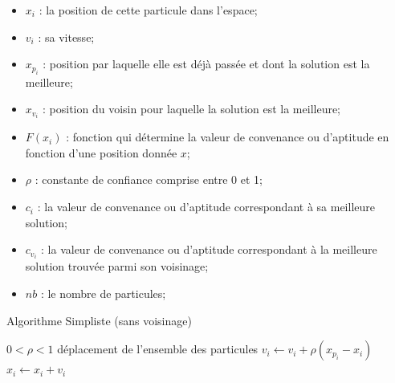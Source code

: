 \documentclass[12pt]{article}
\begin{document}
\begin{itemize}
	\item \textit{ $x_{i}$ } : la position de cette particule dans l'espace;
	\item \textit{ $v_{i}$ } : sa vitesse;
	\item  \textit{ $x_{p_{i}}$ } : position par laquelle elle est déjà passée et dont la solution est la meilleure; 
	\item  \textit{ $x_{v_{i}}$ } : position du voisin pour laquelle la solution est la meilleure; 
 	\item \textit{ $F(x_{i})$ } : fonction qui détermine la valeur de convenance ou d'aptitude en fonction d'une position donnée $x$;
    \item \textit{ $\rho$ } : constante de confiance comprise entre 0 et 1;
    \item \textit{ $c_{i}$ } : la valeur de convenance ou d'aptitude correspondant à sa meilleure solution;
    \item \textit{ $c_{v_{i}}$ } : la valeur de convenance ou d'aptitude correspondant à la meilleure solution trouvée parmi son voisinage;
    \item \textit{ $nb$ } : le nombre de particules;
\end{itemize}
    \begin{algorithm}
    \caption{Algorithme Simpliste (sans voisinage)}
    \begin{algorithmic}
      \REQUIRE $ 0 < \rho < 1 $        %
      \ENSURE déplacement de l'ensemble des particules
      \REPEAT
              \ENDIF
              \STATE $ v_{i} \leftarrow v_{i} + \rho(x_{p_{i}} - x_{i}) $
              \STATE $ x_{i} \leftarrow x_{i} + v_{i} $
          \ENDFOR
    \end{algorithmic}
    \end{algorithm}
    
\end{document}
